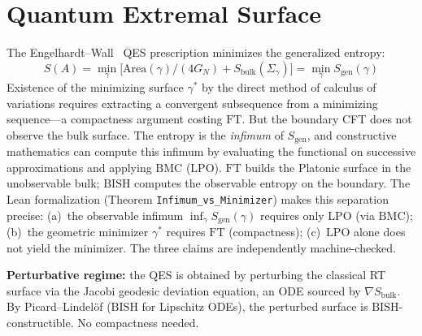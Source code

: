\documentclass[11pt,a4paper]{report}
\theoremstyle{plain}
\theoremstyle{definition}
\theoremstyle{remark}
\newcommand{\BISH}{\mathrm{BISH}}
\newcommand{\LPO}{\mathrm{LPO}}
\newcommand{\BMC}{\mathrm{BMC}}
\newcommand{\FT}{\mathrm{FT}}
\begin{document}
\section{Quantum Extremal Surface}

The Engelhardt--Wall~\cite{EngelhardtWall2015} QES prescription minimizes the generalized entropy:
\[
  S(A) = \min_\gamma\bigl[\mathrm{Area}(\gamma)/(4G_N) + S_{\mathrm{bulk}}(\Sigma_\gamma)\bigr] = \min_\gamma S_{\mathrm{gen}}(\gamma)
\]
Existence of the minimizing surface $\gamma^*$ by the direct method of calculus of variations requires extracting a convergent subsequence from a minimizing sequence---a compactness argument costing $\FT$. But the boundary CFT does not observe the bulk surface. The entropy is the \emph{infimum} of $S_{\mathrm{gen}}$, and constructive mathematics can compute this infimum by evaluating the functional on successive approximations and applying $\BMC$ ($\LPO$). $\FT$ builds the Platonic surface in the unobservable bulk; $\BISH$ computes the observable entropy on the boundary. The Lean formalization (Theorem \texttt{Infimum\_vs\_Minimizer}) makes this separation precise: (a)~the observable infimum $\inf_\gamma S_{\mathrm{gen}}(\gamma)$ requires only $\LPO$ (via $\BMC$); (b)~the geometric minimizer $\gamma^*$ requires $\FT$ (compactness); (c)~$\LPO$ alone does not yield the minimizer. The three claims are independently machine-checked.

\textbf{Perturbative regime:} the QES is obtained by perturbing the classical RT surface via the Jacobi geodesic deviation equation, an ODE sourced by $\nabla S_{\mathrm{bulk}}$. By Picard--Lindel\"of ($\BISH$ for Lipschitz ODEs), the perturbed surface is $\BISH$-constructible. No compactness needed.
\end{document}
